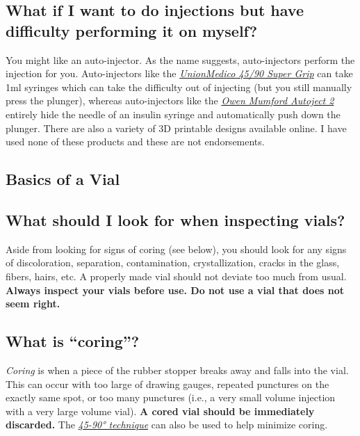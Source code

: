 \documentclass{article}
\begin{document}
\subsection{What if I want to do injections but have difficulty performing it on myself?}\label{5-21}

You might like an auto-injector. As the name suggests, auto-injectors perform the injection for you. Auto-injectors like the \href{https://unionmedico.com/90-super-grip/}{\textit{UnionMedico 45/90 Super Grip}} can take 1ml syringes which can take the difficulty out of injecting (but you still manually press the plunger), whereas auto-injectors like the \href{https://www.owenmumford.com/us/medical-devices/autoject-2}{\textit{Owen Mumford Autoject 2}} entirely hide the needle of an insulin syringe and automatically push down the plunger. There are also a variety of 3D printable designs available online. I have used none of these products and these are not endorsements.

\subsection*{Basics of a Vial}

\subsection{What should I look for when inspecting vials?}

Aside from looking for signs of coring (see below), you should look for any signs of discoloration, separation, contamination, crystallization, cracks in the glass, fibers, hairs, etc. A properly made vial should not deviate too much from usual. \textbf{Always inspect your vials before use. Do not use a vial that does not seem right.}

\subsection{What is “coring”?}\label{5-23}

\textit{Coring} is when a piece of the rubber stopper breaks away and falls into the vial. This can occur with too large of drawing gauges, repeated punctures on the exactly same spot, or too many punctures (i.e., a very small volume injection with a very large volume vial). \textbf{A cored vial should be immediately discarded. }The \href{https://www.youtube.com/watch?v=w5F0SLoMjC8}{\textit{45-90° technique}} can also be used to help minimize coring.
\end{document}
